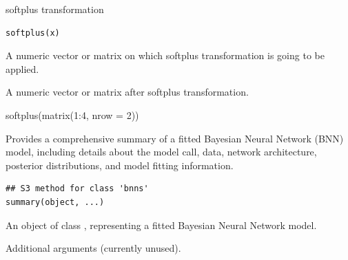 \documentclass[a4paper]{book}
\begin{document}
%
\begin{Description}
softplus transformation
\end{Description}
%
\begin{Usage}
\begin{verbatim}
softplus(x)
\end{verbatim}
\end{Usage}
%
\begin{Arguments}
\begin{ldescription}
\item[\code{x}] A numeric vector or matrix on which softplus transformation is going to be applied.
\end{ldescription}
\end{Arguments}
%
\begin{Value}
A numeric vector or matrix after softplus transformation.
\end{Value}
%
\begin{Examples}
\begin{ExampleCode}
softplus(matrix(1:4, nrow = 2))
\end{ExampleCode}
\end{Examples}
%
\begin{Description}
Provides a comprehensive summary of a fitted Bayesian Neural Network (BNN) model, including details about the model call, data, network architecture, posterior distributions, and model fitting information.
\end{Description}
%
\begin{Usage}
\begin{verbatim}
## S3 method for class 'bnns'
summary(object, ...)
\end{verbatim}
\end{Usage}
%
\begin{Arguments}
\begin{ldescription}
\item[\code{object}] An object of class , representing a fitted Bayesian Neural Network model.

\item[\code{...}] Additional arguments (currently unused).
\end{ldescription}
\end{Arguments}
%
\end{document}
